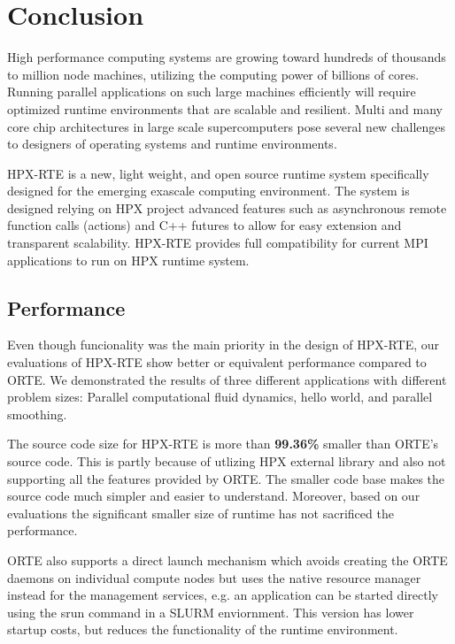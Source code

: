 \chapter{Conclusion}
\label{sec:Conclusion}

High performance computing systems are growing toward hundreds of thousands to million node machines, utilizing the computing power of billions of cores. Running parallel applications on such large machines efficiently will require optimized runtime environments that are scalable and resilient. Multi and many core chip architectures in large scale supercomputers pose several new challenges to designers of operating systems and runtime environments.

HPX-RTE is a new, light weight, and open source runtime system specifically designed for the emerging exascale computing environment. The system is designed relying on HPX project advanced features such as asynchronous remote function calls (actions) and C++ futures to allow for easy extension and transparent scalability. HPX-RTE provides full compatibility for current MPI applications to run on HPX runtime system. 

\section{Performance}
Even though funcionality was the main priority in the design of HPX-RTE, our evaluations of HPX-RTE show better or equivalent performance compared to ORTE. We demonstrated the results of three different applications with different problem sizes: Parallel computational fluid dynamics, hello world, and parallel smoothing.

The source code size for HPX-RTE is more than \textbf{99.36\%} smaller than ORTE's source code. This is partly because of utlizing HPX external library and also not supporting all the features provided by ORTE. The smaller code base makes the source code much simpler and easier to understand. Moreover, based on our evaluations the significant smaller size of runtime has not sacrificed the performance.

ORTE also supports a direct launch mechanism which avoids creating the ORTE daemons on individual compute nodes but uses the native resource manager instead for the management services, e.g. an application can be started directly using the srun command in a SLURM enviornment. This version has lower startup costs, but reduces the functionality of the runtime environment.


